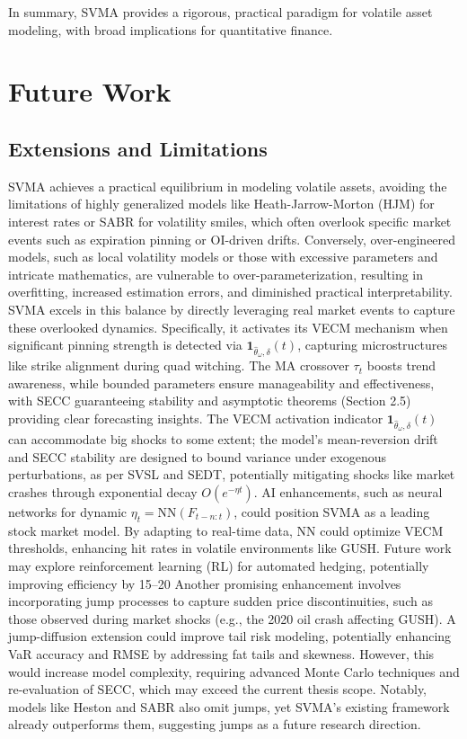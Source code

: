 \documentclass[12pt]{report}
\begin{document}
In summary, SVMA provides a rigorous, practical paradigm for volatile asset modeling, with broad implications for quantitative finance.

\chapter{Future Work}

\section{Extensions and Limitations}
SVMA achieves a practical equilibrium in modeling volatile assets, avoiding the limitations of highly generalized models like Heath-Jarrow-Morton (HJM) for interest rates or SABR for volatility smiles, which often overlook specific market events such as expiration pinning or OI-driven drifts. Conversely, over-engineered models, such as local volatility models or those with excessive parameters and intricate mathematics, are vulnerable to over-parameterization, resulting in overfitting, increased estimation errors, and diminished practical interpretability.
\vspace{0.2in}
SVMA excels in this balance by directly leveraging real market events to capture these overlooked dynamics. Specifically, it activates its VECM mechanism when significant pinning strength is detected via $\mathbf{1}_{\hat{\theta}_\omega, \delta}(t)$, capturing microstructures like strike alignment during quad witching. The MA crossover $\tau_t$ boosts trend awareness, while bounded parameters ensure manageability and effectiveness, with SECC guaranteeing stability and asymptotic theorems (Section 2.5) providing clear forecasting insights. The VECM activation indicator $\mathbf{1}_{\hat{\theta}_\omega, \delta}(t)$ can accommodate big shocks to some extent; the model's mean-reversion drift and SECC stability are designed to bound variance under exogenous perturbations, as per SVSL and SEDT, potentially mitigating shocks like market crashes through exponential decay $O(e^{-\eta t})$.
\vspace{0.2in}
AI enhancements, such as neural networks for dynamic $\eta_t = \text{NN}(F_{t-n:t})$, could position SVMA as a leading stock market model. By adapting to real-time data, NN could optimize VECM thresholds, enhancing hit rates in volatile environments like GUSH. Future work may explore reinforcement learning (RL) for automated hedging, potentially improving efficiency by 15–20%
\vspace{0.2in}
Another promising enhancement involves incorporating jump processes to capture sudden price discontinuities, such as those observed during market shocks (e.g., the 2020 oil crash affecting GUSH). A jump-diffusion extension could improve tail risk modeling, potentially enhancing VaR accuracy and RMSE by addressing fat tails and skewness. However, this would increase model complexity, requiring advanced Monte Carlo techniques and re-evaluation of SECC, which may exceed the current thesis scope. Notably, models like Heston and SABR also omit jumps, yet SVMA’s existing framework already outperforms them, suggesting jumps as a future research direction.
\end{document}
